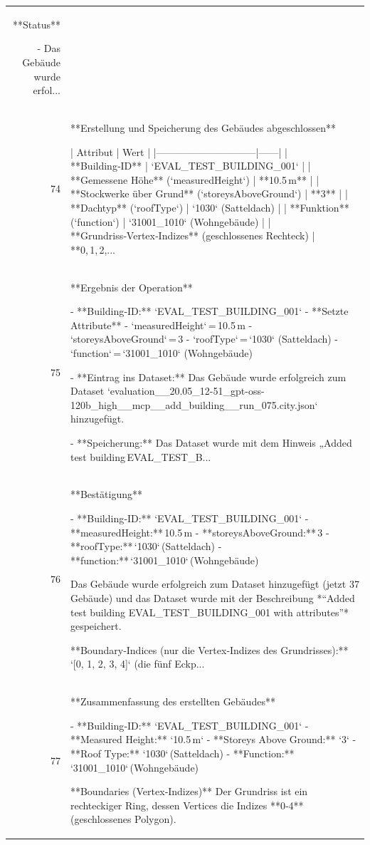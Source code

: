 \documentclass[a4paper,11pt]{article}
\begin{document}
\begin{table}[ht]
\begin{tabular}{r p{12cm}}
**Status**

- Das Gebäude wurde erfol... \\
74 & **Erstellung und Speicherung des Gebäudes abgeschlossen**

| Attribut                     | Wert |
|------------------------------|------|
| **Building‑ID**              | `EVAL\_TEST\_BUILDING\_001` |
| **Gemessene Höhe** (`measuredHeight`) | **10.5 m** |
| **Stockwerke über Grund** (`storeysAboveGround`) | **3** |
| **Dachtyp** (`roofType`)     | `1030` (Satteldach) |
| **Funktion** (`function`)    | `31001\_1010` (Wohngebäude) |
| **Grundriss‑Vertex‑Indizes** (geschlossenes Rechteck) | **0, 1, 2,... \\
75 & **Ergebnis der Operation**

- **Building‑ID:** `EVAL\_TEST\_BUILDING\_001`  
- **Setzte Attribute**  
  - `measuredHeight` = 10.5 m  
  - `storeysAboveGround` = 3  
  - `roofType` = `1030` (Satteldach)  
  - `function` = `31001\_1010` (Wohngebäude)  

- **Eintrag ins Dataset:** Das Gebäude wurde erfolgreich zum Dataset `evaluation\_\_20.05\_12-51\_gpt-oss-120b\_high\_\_mcp\_\_add\_building\_\_run\_075.city.json` hinzugefügt.  

- **Speicherung:** Das Dataset wurde mit dem Hinweis „Added test building EVAL\_TEST\_B... \\
76 & **Bestätigung**

- **Building‑ID:** `EVAL\_TEST\_BUILDING\_001`  
- **measuredHeight:** 10.5 m  
- **storeysAboveGround:** 3  
- **roofType:** `1030` (Satteldach)  
- **function:** `31001\_1010` (Wohngebäude)  

Das Gebäude wurde erfolgreich zum Dataset hinzugefügt (jetzt 37 Gebäude) und das Dataset wurde mit der Beschreibung *“Added test building EVAL\_TEST\_BUILDING\_001 with attributes”* gespeichert.

**Boundary‑Indices (nur die Vertex‑Indizes des Grundrisses):**  
`[0, 1, 2, 3, 4]`   (die fünf Eckp... \\
77 & **Zusammenfassung des erstellten Gebäudes**

- **Building‑ID:** `EVAL\_TEST\_BUILDING\_001`  
- **Measured Height:** `10.5 m`  
- **Storeys Above Ground:** `3`  
- **Roof Type:** `1030` (Satteldach)  
- **Function:** `31001\_1010` (Wohngebäude)  

**Boundaries (Vertex‑Indizes)**  
Der Grundriss ist ein rechteckiger Ring, dessen Vertices die Indizes **0‑4** (geschlossenes Polygon).  


\end{tabular}
\end{table}
\end{document}
